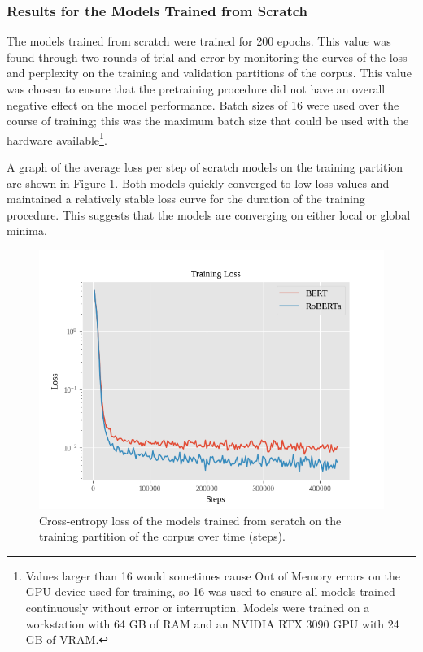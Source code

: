 \documentclass[12pt]{article}
\begin{document}
\subsubsection{Results for the Models Trained from Scratch}\label{sec:scratch_pretraining_results}
The models trained from scratch were trained for 200 epochs. This value was found through two rounds of trial and error by monitoring the curves of
the loss and perplexity on the training and validation partitions of the corpus. This value was chosen to ensure that the pretraining procedure did
not have an overall negative effect on the model performance. Batch sizes of 16 were used over the course of training; this was the maximum batch size
that could be used with the hardware available\footnote{Values larger than 16 would sometimes cause Out of Memory errors on the GPU device used for
    training, so 16 was used to ensure all models trained continuously without error or interruption. Models were trained on a workstation with 64 GB
    of RAM and an NVIDIA RTX 3090 GPU with 24 GB of VRAM.}.

A graph of the average loss per step of scratch models on the training partition are shown in Figure \ref{fig:scratch_training_loss}. Both models
quickly converged to low loss values and maintained a relatively stable loss curve for the duration of the training procedure. This suggests that the
models are converging on either local or global minima.

\begin{figure}[!t]
    \includegraphics[width=\linewidth]{figures/scratch_training_loss.png}
    \caption{Cross-entropy loss of the models trained from scratch on the training partition of the corpus over time (steps).}
    \label{fig:scratch_training_loss}
\end{figure}
\end{document}
